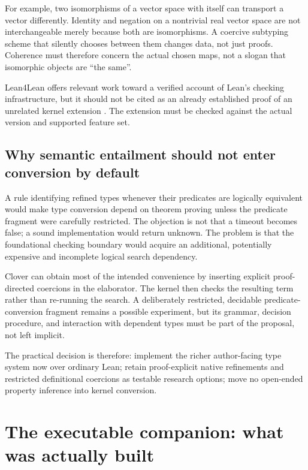 \documentclass[11pt,a4paper]{article}
\theoremstyle{definition}
\theoremstyle{remark}
\begin{document}
For example, two isomorphisms of a vector space with itself can transport a
vector differently. Identity and negation on a nontrivial real vector space
are not interchangeable merely because both are isomorphisms. A coercive
subtyping scheme that silently chooses between them changes data, not just
proofs. Coherence must therefore concern the actual chosen maps, not a slogan
that isomorphic objects are ``the same''.

Lean4Lean offers relevant work toward a verified account of Lean's checking
infrastructure, but it should not be cited as an already established proof of
an unrelated kernel extension \cite{lean4lean}. The extension must be checked
against the actual version and supported feature set.

\subsection{Why semantic entailment should not enter conversion by default}

A rule identifying refined types whenever their predicates are logically
equivalent would make type conversion depend on theorem proving unless the
predicate fragment were carefully restricted. The objection is not that a
timeout becomes false; a sound implementation would return unknown. The
problem is that the foundational checking boundary would acquire an additional,
potentially expensive and incomplete logical search dependency.

Clover can obtain most of the intended convenience by inserting explicit
proof-directed coercions in the elaborator. The kernel then checks the
resulting term rather than re-running the search. A deliberately restricted,
decidable predicate-conversion fragment remains a possible experiment, but
its grammar, decision procedure, and interaction with dependent types must be
part of the proposal, not left implicit.

The practical decision is therefore: implement the richer author-facing type
system now over ordinary Lean; retain proof-explicit native refinements and
restricted definitional coercions as testable research options; move no open-ended
property inference into kernel conversion.

\section{The executable companion: what was actually built}\label{sec:prototype}
\end{document}
